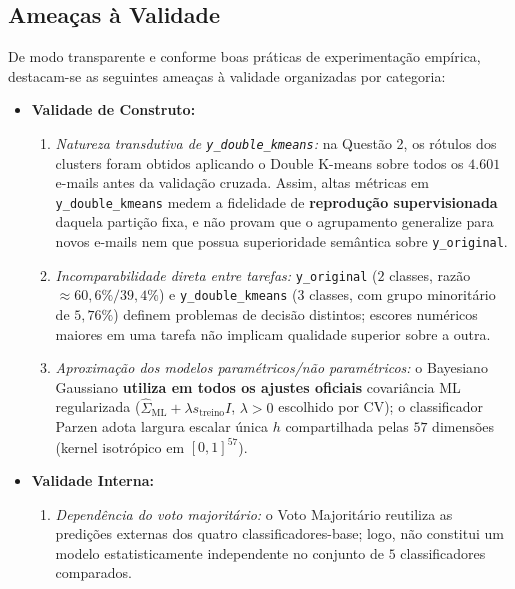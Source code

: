 \documentclass[a4paper,11pt]{article}
\begin{document}
\subsection{Ameaças à Validade}\label{sec:3-2-ameacas-a-validade}


De modo transparente e conforme boas práticas de experimentação empírica, destacam-se as seguintes ameaças à validade organizadas por categoria:

\begin{itemize}[leftmargin=1.5em, itemsep=0.25em, topsep=0.25em]
  \item \textbf{Validade de Construto:}
\begin{enumerate}[leftmargin=1.5em, itemsep=0.25em, topsep=0.25em]
  \item \textit{Natureza transdutiva de \texttt{y\_\allowbreak double\_\allowbreak kmeans}:} na Questão 2, os rótulos dos clusters foram obtidos aplicando o Double K-means sobre todos os $4.601$ e-mails antes da validação cruzada. Assim, altas métricas em \texttt{y\_\allowbreak double\_\allowbreak kmeans} medem a fidelidade de \textbf{reprodução supervisionada} daquela partição fixa, e não provam que o agrupamento generalize para novos e-mails nem que possua superioridade semântica sobre \texttt{y\_\allowbreak original}.
  \item \textit{Incomparabilidade direta entre tarefas:} \texttt{y\_\allowbreak original} ($2$ classes, razão $\approx 60,6\% / 39,4\%$) e \texttt{y\_\allowbreak double\_\allowbreak kmeans} ($3$ classes, com grupo minoritário de $5,76\%$) definem problemas de decisão distintos; escores numéricos maiores em uma tarefa não implicam qualidade superior sobre a outra.
  \item \textit{Aproximação dos modelos paramétricos/não paramétricos:} o Bayesiano Gaussiano \textbf{utiliza em todos os ajustes oficiais} covariância ML regularizada ($\hat\Sigma_{\mathrm{ML}}+\lambda s_{\text{treino}}I$, $\lambda>0$ escolhido por CV); o classificador Parzen adota largura escalar única $h$ compartilhada pelas $57$ dimensões (kernel isotrópico em $[0,1]^{57}$).
\end{enumerate}
  \item \textbf{Validade Interna:}
\begin{enumerate}[leftmargin=1.5em, itemsep=0.25em, topsep=0.25em]
  \item \textit{Dependência do voto majoritário:} o Voto Majoritário reutiliza as predições externas dos quatro classificadores-base; logo, não constitui um modelo estatisticamente independente no conjunto de $5$ classificadores comparados.

\end{enumerate}
\end{itemize}
\end{document}
